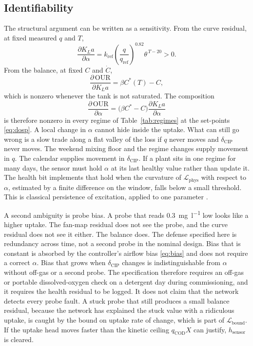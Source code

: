 \subsection{Identifiability}

The structural argument can be written as a sensitivity. From the curve residual, at fixed measured $q$ and $T$,
\begin{equation}
\label{eq:sens-kla}
\frac{\partial K_La}{\partial \alpha}
=
k_{\mathrm{ref}}
\left(\frac{q}{q_{\mathrm{ref}}}\right)^{0.82}
\theta^{\,T-20}
>
0.
\end{equation}
From the balance, at fixed $C$ and $\dot{C}$,
\begin{equation}
\label{eq:sens-our}
\frac{\partial\,\mathrm{OUR}}{\partial K_La}
=
\beta C^{*}(T)-C,
\end{equation}
which is nonzero whenever the tank is not saturated. The composition
\begin{equation}
\frac{\partial\,\mathrm{OUR}}{\partial \alpha}
=
\big(\beta C^{*}-C\big)
\frac{\partial K_La}{\partial \alpha}
\end{equation}
is therefore nonzero in every regime of Table~\ref{tab:regimes} at the set-points \eqref{eq:dosp}. A local change in $\alpha$ cannot hide inside the uptake. What can still go wrong is a slow trade along a flat valley of the loss if $q$ never moves and $\delta_{\mathrm{CIP}}$ never moves. The weekend mixing floor and the regime changes supply movement in $q$. The calendar supplies movement in $\delta_{\mathrm{CIP}}$. If a plant sits in one regime for many days, the sensor must hold $\alpha$ at its last healthy value rather than update it. The health bit implements that hold when the curvature of $\mathcal{L}_{\mathrm{phys}}$ with respect to $\alpha$, estimated by a finite difference on the window, falls below a small threshold. This is classical persistence of excitation, applied to one parameter \cite{ljung1999}.

A second ambiguity is probe bias. A probe that reads \SI{0.3}{\milli\gram\per\litre} low looks like a higher uptake. The fan-map residual does not see the probe, and the curve residual does not see it either. The balance does. The defense specified here is redundancy across time, not a second probe in the nominal design. Bias that is constant is absorbed by the controller's airflow bias \eqref{eq:bias} and does not require a correct $\alpha$. Bias that grows when $\delta_{\mathrm{CIP}}$ changes is indistinguishable from $\alpha$ without off-gas or a second probe. The specification therefore requires an off-gas or portable dissolved-oxygen check on a detergent day during commissioning, and it requires the health residual to be logged. It does not claim that the network detects every probe fault. A stuck probe that still produces a small balance residual, because the network has explained the stuck value with a ridiculous uptake, is caught by the bound on uptake rate of change, which is part of $\mathcal{L}_{\mathrm{bound}}$. If the uptake head moves faster than the kinetic ceiling $q_{\mathrm{COD}}X$ can justify, $h_{\mathrm{sensor}}$ is cleared.

